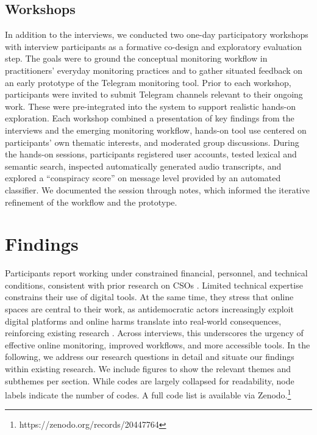 \documentclass[acmsmall]{acmart}
\begin{document}
\subsection{Workshops}
In addition to the interviews, we conducted two one-day participatory workshops with interview participants as a formative co-design and exploratory evaluation step. The goals were to ground the conceptual monitoring workflow in practitioners' everyday monitoring practices and to gather situated feedback on an early prototype of the Telegram monitoring tool.
Prior to each workshop, participants were invited to submit Telegram channels relevant to their ongoing work. These were pre-integrated into the system to support realistic hands-on exploration. Each workshop combined a presentation of key findings from the interviews and the emerging monitoring workflow, hands-on tool use centered on participants' own thematic interests, and moderated group discussions.
During the hands-on sessions, participants registered user accounts, tested lexical and semantic search, inspected automatically generated audio transcripts, and explored a ``conspiracy score'' on message level provided by an automated classifier.  
We documented the session through notes, which informed the iterative refinement of the workflow and the prototype. 

\section{Findings}
\label{sec:findings}
Participants report working under constrained financial, personnel, and technical conditions, consistent with prior research on CSOs \cite{samarin_surveying_2020,baumler_harnessing_2025}. Limited technical expertise constrains their use of digital tools. At the same time, they stress that online spaces are central to their work, as antidemocratic actors increasingly exploit digital platforms and online harms translate into real-world consequences, reinforcing existing research \cite{eu_parliament_2024,adl_hate_report_2023,conway_right-wing_2019}. Across interviews, this underscores the urgency of effective online monitoring, improved workflows, and more accessible tools.
In the following, we address our research questions in detail and situate our findings within existing research. We include figures to show the relevant themes and subthemes per section. While codes are largely collapsed for readability, node labels indicate the number of codes. A full code list is available via Zenodo.\footnote{https://zenodo.org/records/20447764}
\end{document}
